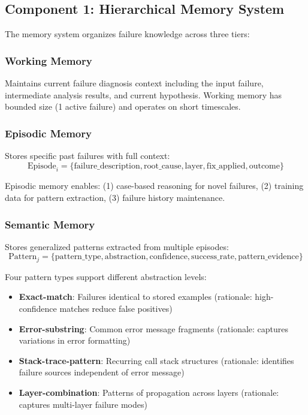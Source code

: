 \documentclass[11pt]{article}
\begin{document}
\subsection{Component 1: Hierarchical Memory System}

The memory system organizes failure knowledge across three tiers:

\subsubsection{Working Memory}
Maintains current failure diagnosis context including the input failure, intermediate analysis results, and current hypothesis. Working memory has bounded size (1 active failure) and operates on short timescales.

\subsubsection{Episodic Memory}
Stores specific past failures with full context:
\begin{equation}
\text{Episode}_i = \{\text{failure\_description}, \text{root\_cause}, \text{layer}, \text{fix\_applied}, \text{outcome}\}
\end{equation}

Episodic memory enables: (1) case-based reasoning for novel failures, (2) training data for pattern extraction, (3) failure history maintenance.

\subsubsection{Semantic Memory}
Stores generalized patterns extracted from multiple episodes:
\begin{equation}
\text{Pattern}_j = \{\text{pattern\_type}, \text{abstraction}, \text{confidence}, \text{success\_rate}, \text{pattern\_evidence}\}
\end{equation}

Four pattern types support different abstraction levels:
\begin{itemize}
    \item \textbf{Exact-match}: Failures identical to stored examples (rationale: high-confidence matches reduce false positives)
    \item \textbf{Error-substring}: Common error message fragments (rationale: captures variations in error formatting)
    \item \textbf{Stack-trace-pattern}: Recurring call stack structures (rationale: identifies failure sources independent of error message)
    \item \textbf{Layer-combination}: Patterns of propagation across layers (rationale: captures multi-layer failure modes)
\end{itemize}
\end{document}
